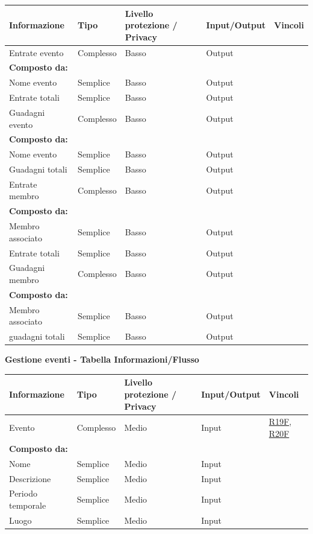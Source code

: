 \documentclass[a4paper]{article}
\begin{document}
\begin{center}
    \begin{tabularx}{1\textwidth}{|X|X|X|X|X|}
        \hline
        \textbf{Informazione} &\textbf{Tipo} & \textbf{Livello protezione / Privacy} & \textbf{Input/Output} & \textbf{Vincoli}\\
        \hline
        \hline
        Entrate evento & Complesso & Basso & Output & \\
        \textbf{Composto da:} & & & & \\
        Nome evento & Semplice & Basso & Output & \\
        Entrate totali & Semplice & Basso & Output & \\
        \hline
        Guadagni evento & Complesso & Basso & Output & \\
        \textbf{Composto da:} & & & & \\
        Nome evento & Semplice & Basso & Output & \\
        Guadagni totali & Semplice & Basso & Output & \\
        \hline
        Entrate membro & Complesso & Basso & Output & \\
        \textbf{Composto da:} & & & & \\
        Membro associato & Semplice & Basso & Output & \\
        Entrate totali & Semplice & Basso & Output & \\
        \hline
        Guadagni membro & Complesso & Basso & Output & \\
        \textbf{Composto da:} & & & & \\
        Membro associato & Semplice & Basso & Output & \\
        guadagni totali & Semplice & Basso & Output & \\
        \hline
    \end{tabularx}
\end{center}

\newpage

\textbf{Gestione eventi  - Tabella Informazioni/Flusso}

\begin{center}
    \begin{tabularx}{1\textwidth}{|X|X|X|X|X|}
        \hline
        \textbf{Informazione} &\textbf{Tipo} & \textbf{Livello protezione / Privacy} & \textbf{Input/Output} & \textbf{Vincoli}\\
        \hline
        \hline
        Evento & Complesso & Medio & Input & \hyperlink{R19F}{R19F}, \hyperlink{R20F}{R20F} \\
        \textbf{Composto da:} & & & & \\
        Nome & Semplice & Medio & Input & \\
        Descrizione & Semplice & Medio & Input & \\
        Periodo temporale & Semplice & Medio & Input & \\
        Luogo & Semplice & Medio & Input & \\
        \hline
    \end{tabularx}
\end{center}
\end{document}
